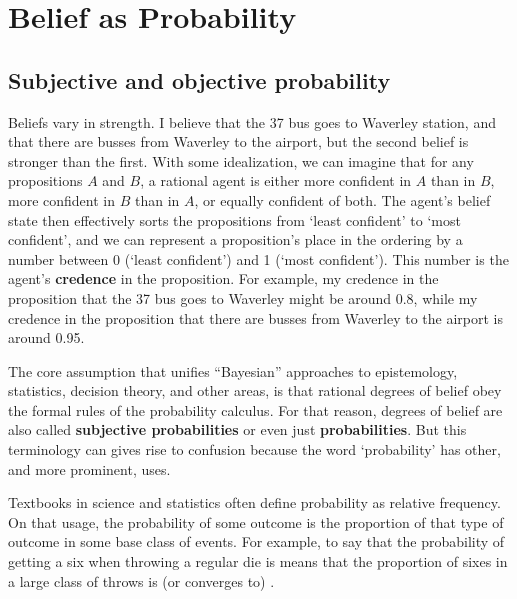 \chapter{Belief as Probability}\label{ch:probability}



\section{Subjective and objective probability}

Beliefs vary in strength. I believe that the 37 bus goes to Waverley
station, and that there are busses from Waverley to the airport, but
the second belief is stronger than the first. With some idealization,
we can imagine that for any propositions $A$ and $B$, a rational agent
is either more confident in $A$ than in $B$, more confident in $B$
than in $A$, or equally confident of both. The agent's belief state
then effectively sorts the propositions from `least confident' to
`most confident', and we can represent a proposition's place in the
ordering by a number between 0 (`least confident') and 1 (`most
confident'). This number is the agent's \textbf{credence} in the
proposition. For example, my credence in the proposition that the 37
bus goes to Waverley might be around 0.8, while my credence in the
proposition that there are busses from Waverley to the airport is
around 0.95.

The core assumption that unifies ``Bayesian'' approaches to
epistemology, statistics, decision theory, and other areas, is that
rational degrees of belief obey the formal rules of the probability
calculus. For that reason, degrees of belief are also called
\textbf{subjective probabilities} or even just \textbf{probabilities}.
But this terminology can gives rise to confusion because the word
`probability' has other, and more prominent, uses.

Textbooks in science and statistics often define probability as
relative frequency. On that usage, the probability of some outcome is
the proportion of that type of outcome in some base class of
events. For example, to say that the probability of getting a six when
throwing a regular die is  means that the proportion of
sixes in a large class of throws is (or converges to) .

